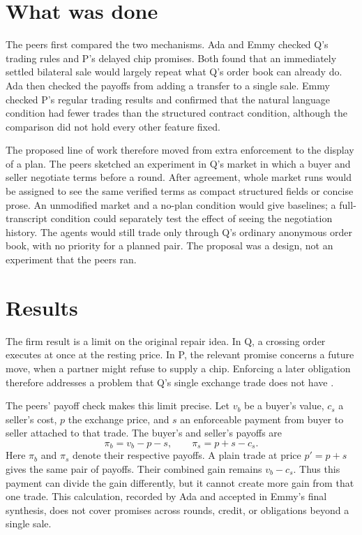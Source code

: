 \documentclass{article}
\begin{document}
\section{What was done}

The peers first compared the two mechanisms. Ada and Emmy checked Q's trading rules and P's delayed
chip promises. Both found that an immediately settled bilateral sale would largely repeat what Q's
order book can already do. Ada then checked the payoffs from adding a transfer to a single sale.
Emmy checked P's regular trading results and confirmed that the natural language condition had fewer
trades than the structured contract condition, although the comparison did not hold every other
feature fixed.

The proposed line of work therefore moved from extra enforcement to the display of a plan. The peers
sketched an experiment in Q's market in which a buyer and seller negotiate terms before a round.
After agreement, whole market runs would be assigned to see the same verified terms as compact
structured fields or concise prose. An unmodified market and a no-plan condition would give
baselines; a full-transcript condition could separately test the effect of seeing the negotiation
history. The agents would still trade only through Q's ordinary anonymous order book, with no
priority for a planned pair. The proposal was a design, not an experiment that the peers ran.

\section{Results}

The firm result is a limit on the original repair idea. In Q, a crossing order executes at once at
the resting price. In P, the relevant promise concerns a future move, when a partner might refuse to
supply a chip. Enforcing a later obligation therefore addresses a problem that Q's single exchange
trade does not have \cite{Q,P}.

The peers' payoff check makes this limit precise. Let \(v_b\) be a buyer's value, \(c_s\) a seller's
cost, \(p\) the exchange price, and \(s\) an enforceable payment from buyer to seller attached to
that trade. The buyer's and seller's payoffs are
\[
\pi_b=v_b-p-s,\qquad \pi_s=p+s-c_s.
\]
Here \(\pi_b\) and \(\pi_s\) denote their respective payoffs. A plain trade at price \(p'=p+s\)
gives the same pair of payoffs. Their combined gain remains \(v_b-c_s\). Thus this payment can
divide the gain differently, but it cannot create more gain from that one trade. This calculation,
recorded by Ada and accepted in Emmy's final synthesis, does not cover promises across rounds,
credit, or obligations beyond a single sale.
\end{document}
